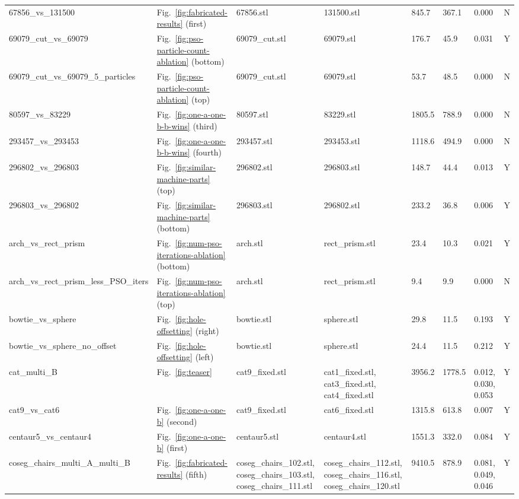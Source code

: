 \begin{tabular}{lllllll}
67856\_vs\_131500 & Fig.~\ref{fig:fabricated-results} (first) & 67856.stl & 131500.stl & 845.7 & 367.1 & 0.000 & N \\
69079\_cut\_vs\_69079 & Fig.~\ref{fig:pso-particle-count-ablation} (bottom) & 69079\_cut.stl & 69079.stl & 176.7 & 45.9 & 0.031 & Y \\
69079\_cut\_vs\_69079\_5\_particles & Fig.~\ref{fig:pso-particle-count-ablation} (top) & 69079\_cut.stl & 69079.stl & 53.7 & 48.5 & 0.000 & N \\
80597\_vs\_83229 & Fig.~\ref{fig:one-a-one-b-b-wins} (third) & 80597.stl & 83229.stl & 1805.5 & 788.9 & 0.000 & N \\
293457\_vs\_293453 & Fig.~\ref{fig:one-a-one-b-b-wins} (fourth) & 293457.stl & 293453.stl & 1118.6 & 494.9 & 0.000 & N \\
296802\_vs\_296803 & Fig.~\ref{fig:similar-machine-parts} (top) & 296802.stl & 296803.stl & 148.7 & 44.4 & 0.013 & Y \\
296803\_vs\_296802 & Fig.~\ref{fig:similar-machine-parts} (bottom) & 296803.stl & 296802.stl & 233.2 & 36.8 & 0.006 & Y \\
arch\_vs\_rect\_prism & Fig.~\ref{fig:num-pso-iterations-ablation} (bottom) & arch.stl & rect\_prism.stl & 23.4 & 10.3 & 0.021 & Y \\
arch\_vs\_rect\_prism\_less\_PSO\_iters & Fig.~\ref{fig:num-pso-iterations-ablation} (top) & arch.stl & rect\_prism.stl & 9.4 & 9.9 & 0.000 & N \\
bowtie\_vs\_sphere & Fig.~\ref{fig:hole-offsetting} (right) & bowtie.stl & sphere.stl & 29.8 & 11.5 & 0.193 & Y \\
bowtie\_vs\_sphere\_no\_offset & Fig.~\ref{fig:hole-offsetting} (left) & bowtie.stl & sphere.stl & 24.4 & 11.5 & 0.212 & Y \\
cat\_multi\_B & Fig.~\ref{fig:teaser} & cat9\_fixed.stl & cat1\_fixed.stl, cat3\_fixed.stl, cat4\_fixed.stl & 3956.2 & 1778.5 & 0.012, 0.030, 0.053 & Y \\
cat9\_vs\_cat6 & Fig.~\ref{fig:one-a-one-b} (second) & cat9\_fixed.stl & cat6\_fixed.stl & 1315.8 & 613.8 & 0.007 & Y \\
centaur5\_vs\_centaur4 & Fig.~\ref{fig:one-a-one-b} (first) & centaur5.stl & centaur4.stl & 1551.3 & 332.0 & 0.084 & Y \\
coseg\_chairs\_multi\_A\_multi\_B & Fig.~\ref{fig:fabricated-results} (fifth) & coseg\_chairs\_102.stl, coseg\_chairs\_103.stl, coseg\_chairs\_111.stl & coseg\_chairs\_112.stl, coseg\_chairs\_116.stl, coseg\_chairs\_120.stl & 9410.5 & 878.9 & 0.081, 0.049, 0.046 & Y \\

\end{tabular}
